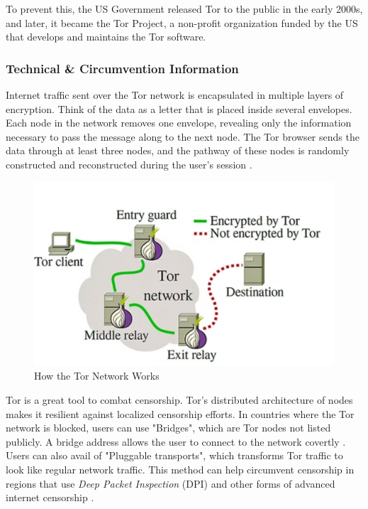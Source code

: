 To prevent this, the US Government released Tor to the public in the early 2000s, and later, it became the Tor Project, a non-profit organization funded by the US that develops and maintains the Tor software. 

\subsubsection{Technical \& Circumvention Information}

Internet traffic sent over the Tor network is encapsulated in multiple layers of encryption. Think of the data as a letter that is placed inside several envelopes. Each node in the network removes one envelope, revealing only the information necessary to pass the message along to the next node. The Tor browser sends the data through at least three nodes, and the pathway of these nodes is randomly constructed and reconstructed during the user's session \cite{dingledine2004tor}.

\begin{figure}[H]
    \centering
    \includegraphics[width=\textwidth]{Griff/TCD SCSS CAPSTONE/Literature Review/Screenshot_13-4-2025_133514_static.wixstatic.com.jpeg}
    \caption{How the Tor Network Works \cite{HowTheTorNetworkWorks}}
    \label{fig:how-the-tor-network-works}
\end{figure}

Tor is a great tool to combat censorship. Tor's distributed architecture of nodes makes it resilient against localized censorship efforts. In countries where the Tor network is blocked, users can use "Bridges", which are Tor nodes not listed publicly. A bridge address allows the user to connect to the network covertly \cite{torprojectBRIDGESProject}. Users can also avail of "Pluggable transports", which transforms Tor traffic to look like regular network traffic. This method can help circumvent censorship in regions that use \textit{Deep Packet Inspection} (DPI) and other forms of advanced internet censorship \cite{torprojectCIRCUMVENTIONProject}.

